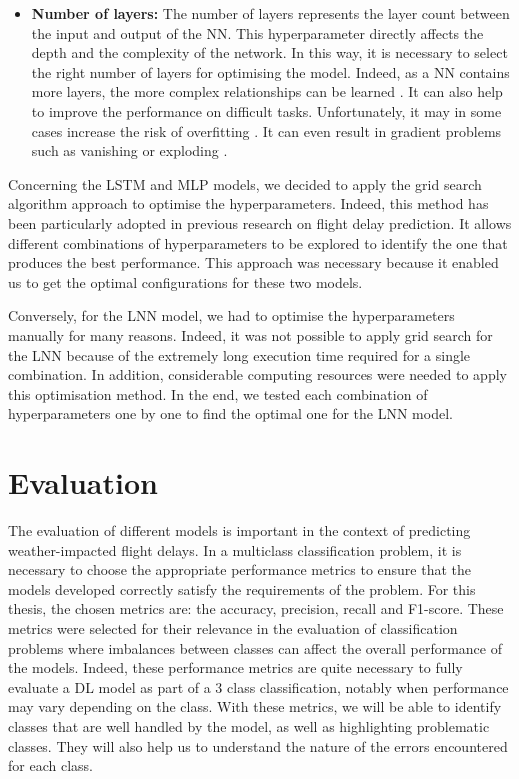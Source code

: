 \documentclass[12pt,oneside]{book} %
\begin{document}
\begin{itemize}
    \item \textbf{Number of layers:} The number of layers represents the layer count between the input and output of the NN. This hyperparameter directly affects the depth and the complexity of the network. In this way, it is necessary to select the right number of layers for optimising the model. Indeed, as a NN contains more layers, the more complex relationships can be learned \cite{Hyperparameters}. It can also help to improve the performance on difficult tasks. Unfortunately, it may in some cases increase the risk of overfitting \cite{Hyperparameters1}. It can even result in gradient problems such as vanishing or exploding \cite{Gradient}.
\end{itemize}

\noindent Concerning the LSTM and MLP models, we decided to apply the grid search algorithm approach to optimise the hyperparameters. Indeed, this method has been particularly adopted in previous research on flight delay prediction. It allows different combinations of hyperparameters to be explored to identify the one that produces the best performance. This approach was necessary because it enabled us to get the optimal configurations for these two models. 

\noindent Conversely, for the LNN model, we had to optimise the hyperparameters manually for many reasons. Indeed, it was not possible to apply grid search for the LNN because of the extremely long execution time required for a single combination. In addition, considerable computing resources were needed to apply this optimisation method. In the end, we tested each combination of hyperparameters one by one to find the optimal one for the LNN model.

\section{Evaluation}
\label{evaluation}

\noindent The evaluation of different models is important in the context of predicting weather-impacted flight delays. In a multiclass classification problem, it is necessary to choose the appropriate performance metrics to ensure that the models developed correctly satisfy the requirements of the problem. For this thesis, the chosen metrics are: the accuracy, precision, recall and F1-score. These metrics were selected for their relevance in the evaluation of classification problems where imbalances between classes can affect the overall performance of the models. Indeed, these performance metrics are quite necessary to fully evaluate a DL model as part of a 3 class classification, notably when performance may vary depending on the class. With these metrics, we will be able to identify classes that are well handled by the model, as well as highlighting problematic classes. They will also help us to understand the nature of the errors encountered for each class.
\end{document}
